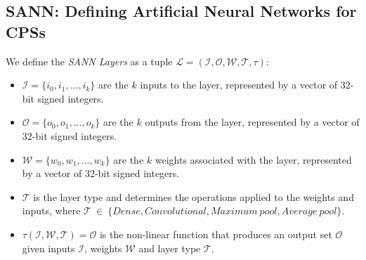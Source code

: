 

\subsection{\ac{SANN}: Defining Artificial Neural Networks for \acp{CPS}}
\begin{definition}
	\label{def:layer}We define the \emph{\ac{SANN} Layers} as a tuple $\mathcal{L} = (\mathcal{I}, \mathcal{O}, \mathcal{W}, \mathcal{T}, \tau)$:
	\begin{itemize}
		\item $\mathcal{I} = \{i_0, i_1, ..., i_k \}$ are the $k$ inputs to the layer, represented by a vector of 32-bit signed integers.
		\item $\mathcal{O} = \{o_0, o_1, ..., o_k \}$ are the $k$ outputs from the layer, represented by a vector of 32-bit signed integers.
		\item $\mathcal{W} = \{w_0, w_1, ..., w_k\}$ are the $k$ weights associated with the layer, represented by a vector of 32-bit signed integers.
		\item $\mathcal{T}$ is the layer type and determines the operations applied to the weights and inputs, where $\mathcal{T}~\in~\{Dense, Convolutional, Maximum~pool, Average~pool\}$.
		\item $\tau(\mathcal{I}, \mathcal{W}, \mathcal{T}) = \mathcal{O}$ is the non-linear function that produces an output set $\mathcal{O}$ given inputs $\mathcal{I}$, weights $\mathcal{W}$ and layer type $\mathcal{T}$. 
	\end{itemize}
\end{definition}

